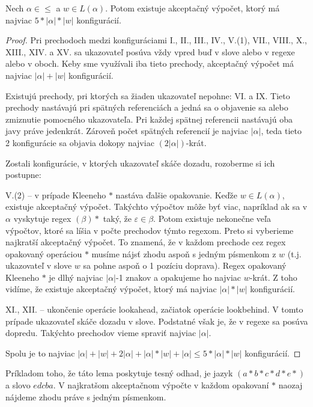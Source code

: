 \begin{lema}
Nech $\alpha \in \le$ a $w \in L(\alpha)$. Potom existuje akceptačný výpočet, ktorý má najviac $5*|\alpha|*|w|$ konfigurácií.
\end{lema}
\begin{proof}
Pri prechodoch medzi konfiguráciami I., II., III., IV., V.(1), VII., VIII., X., XIII., XIV. a XV. sa ukazovateľ posúva vždy vpred buď v slove alebo v regexe alebo v oboch. Keby sme využívali iba tieto prechody, akceptačný výpočet má najviac $\left\vert{\alpha}\right\vert+|w|$ konfigurácií.

Existujú prechody, pri ktorých sa žiaden ukazovateľ nepohne: VI. a IX. Tieto prechody nastávajú pri spätných referenciách a jedná sa o objavenie sa alebo zmiznutie pomocného ukazovateľa. Pri každej spätnej referencii nastávajú oba javy práve jedenkrát. Zároveň počet spätných referencií je najviac $|\alpha|$, teda tieto 2 konfigurácie sa objavia dokopy najviac $(2\left\vert{\alpha}\right\vert)$-krát.

Zostali konfigurácie, v ktorých ukazovateľ skáče dozadu, rozoberme si ich postupne:

V.(2) -- v prípade Kleeneho $*$ nastáva ďalšie opakovanie. Keďže $w\in L(\alpha)$, existuje akceptačný výpočet. Takýchto výpočtov môže byť viac, napríklad ak sa v $\alpha$ vyskytuje regex $(\beta)*$ taký, že $\varepsilon \in \beta$. Potom existuje nekonečne veľa výpočtov, ktoré sa líšia v počte prechodov týmto regexom. Preto si vyberieme najkratší akceptačný výpočet. To znamená, že v každom prechode cez regex opakovaný operáciou $*$ musíme nájsť zhodu aspoň s jedným písmenkom z $w$ (t.j. ukazovateľ v slove $w$ sa pohne aspoň o 1 pozíciu doprava). Regex opakovaný Kleeneho $*$ je dlhý najviac $|\alpha|$-1 znakov a opakujeme ho najviac $w$-krát. Z toho vidíme, že existuje akceptačný výpočet, ktorý má najviac $|\alpha|*|w|$ konfigurácií.

XI., XII. -- ukončenie operácie lookahead, začiatok operácie lookbehind. V tomto prípade ukazovateľ skáče dozadu v slove. Podstatné však je, že v regexe sa posúva dopredu. Takýchto prechodov vieme spraviť najviac $|\alpha|$.

Spolu je to najviac $|\alpha|+|w|+2|\alpha|+|\alpha|*|w|+|\alpha| \leq 5*|\alpha|*|w|$ konfigurácií.

\end{proof}

Príkladom toho, že táto lema poskytuje tesný odhad, je jazyk $(a*b*c*d*e*)$ a slovo $edcba$. V najkratšom akceptačnom výpočte v každom opakovaní $*$ naozaj nájdeme zhodu práve s jedným písmenkom.

